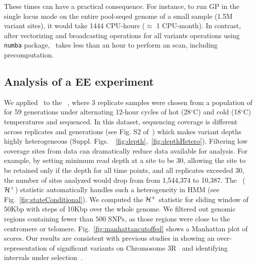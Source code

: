 These times can have a practical consequence. For instance, to run GP
in the single locus mode on the entire pool-seqed \dmel genome of a
small sample (1.5M variant sites), it would take 1444 CPU-hours
($\approx$ 1 CPU-month). In contrast, after vectorizing and
broadcasting operations for all variants operations using
\texttt{numba} package, \comale\ takes less than an hour to perform an
scan, including precomputation. 

\subsection{Analysis of a \dmel EE experiment}\label{sec:dmel}
We applied \comale\ to the \data~\cite{orozco2012adaptation}, where 3
replicate samples were chosen from a population of \dmel for 59
generations under alternating 12-hour cycles of hot (28$^{\circ}$C)
and cold (18$^{\circ}$C) temperatures and sequenced.  In this dataset,
sequencing coverage is different across replicates and generations
(see Fig. S2 of~\cite{Terhorst2015Multi}) which makes variant depths
highly heterogeneous (Suppl.
Figs.~~\ref{fig:depth},~\ref{fig:depthHetero}). Filtering low coverage
sites from data can dramatically reduce data available for
analysis. For example, by setting minimum read depth at a site to be
$30$, allowing the site to be retained only if the depth for all time
points, and all replicates exceeded $30$, the number of sites analyzed
would drop from from 1,544,374 to 10,387. The \comale\ (${\cal H}^{+}$)
statistic automatically handles such a heterogeneity in HMM (see
Fig.~\ref{fig:stateConditional}). We computed the ${\cal H}^{+}$ statistic
for sliding window of 50Kbp with steps of 10Kbp over the whole
genome. We filtered out genomic regions containing fewer than $500$
SNPs, as those regions were close to the centromere or
telomere. Fig.~\ref{fig:manhattancutoffed} shows a Manhattan plot of
scores. Our results are consistent with previous studies in showing an
over-representation of significant variants on Chromosome
3R~\cite{orozco2012adaptation} and identifying intervals under
selection~\cite{Terhorst2015Multi}.

